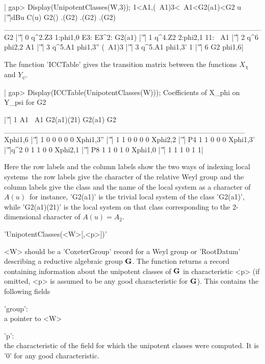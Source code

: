 |    gap> Display(UnipotentClasses(W,3));
    1<A1,(~A1)3<~A1<G2(a1)<G2
         u |'\|'|dBu   C(u)       G2() .(G2) .(G2) .(G2)
    ________________________________________________
    G2     |'\|'|  0 q^2.Z3 1:phi{1,0}         E3: E3^2:
    G2(a1) |'\|'|  1 q^4.Z2 2:phi{2,1}   11:
    ~A1    |'\|'|  2    q^6   phi{2,2}
    A1     |'\|'|  3 q^5.A1 phi{1,3}''
    (~A1)3 |'\|'|  3 q^5.A1  phi{1,3}'
    1      |'\|'|  6     G2   phi{1,6}|

The  function 'ICCTable' gives the  transition matrix between the functions
$X_\chi$  and $Y_\psi$.

|    gap> Display(ICCTable(UnipotentClasses(W)));
    Coefficients of X_phi on Y_psi for G2

                |'\|'|  1 A1 ~A1 G2(a1)(21) G2(a1) G2
    _____________________________________________
    Xphi{1,6}   |'\|'|  1  0   0          0      0  0
    Xphi{1,3}'' |'\|'|  1  1   0          0      0  0
    Xphi{2,2}   |'\|'| P4  1   1          0      0  0
    Xphi{1,3}'  |'\|'|q^2  0   1          1      0  0
    Xphi{2,1}   |'\|'| P8  1   1          0      1  0
    Xphi{1,0}   |'\|'|  1  1   1          0      1  1|

Here  the row labels  and the column  labels show the  two ways of indexing
local  systems\:\ the  row labels  give the  character of the relative Weyl
group and the column labels give the class and the name of the local system
as  a character  of $A(u)$\:\  for instance,  'G2(a1)' is the trivial local
system  of the  class 'G2(a1)',  while 'G2(a1)(21)'  is the local system on
that class corresponding to the 2-dimensional character of $A(u)=A_2$.


'UnipotentClasses(<W>[,<p>])'

<W>  should  be  a  'CoxeterGroup'  record  for a Weyl group or 'RootDatum'
describing a reductive algebraic group ${\bf G}$. The function returns a record
containing   information   about   the   unipotent   classes  of  ${\bf G}$  in
characteristic   <p>  (if   omitted,  <p>   is  assumed   to  be  any  good
characteristic for ${\bf G}$). This contains the following fields\:

'group':\\ a pointer to <W>

'p':\\ the characteristic of the field for which the unipotent classes were
computed. It is '0' for any good characteristic.

